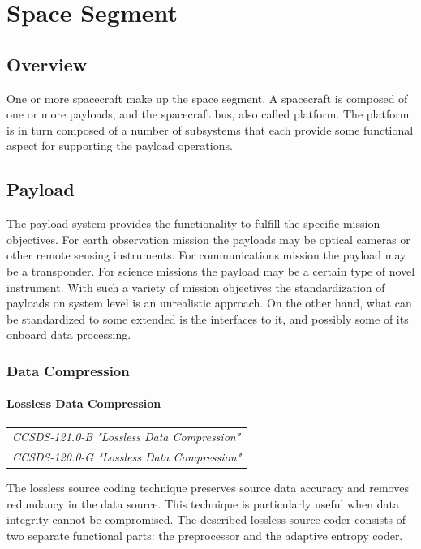 \chapter{Space Segment}

\section{Overview}

One or more spacecraft make up the space segment. A spacecraft is composed of one or more payloads, and the spacecraft bus, also called platform. The platform is in turn composed of a number of subsystems that each provide some functional aspect for supporting the payload operations.

\section{Payload}

The payload system provides the functionality to fulfill the specific mission objectives. For earth observation mission the payloads may be optical cameras or other remote sensing instruments. For communications mission the payload may be a transponder. For science missions the payload may be a certain type of novel instrument. With such a variety of mission objectives the standardization of payloads on system level is an unrealistic approach. On the other hand, what can be standardized to some extended is the interfaces to it, and possibly some of its onboard data processing.

\subsection{Data Compression}

\subsubsection{Lossless Data Compression}

\begin{tabular}{l}
\textit{CCSDS-121.0-B "Lossless Data Compression" \cite{CCSDS-120.0-G}} \\
\textit{CCSDS-120.0-G "Lossless Data Compression" \cite{CCSDS-121.0-B}}
\end{tabular}

The lossless source coding technique preserves source data accuracy and removes redundancy in the data source. This technique is particularly useful when data integrity cannot be compromised. The described lossless source coder consists of two separate functional parts: the preprocessor and the adaptive entropy coder. 

